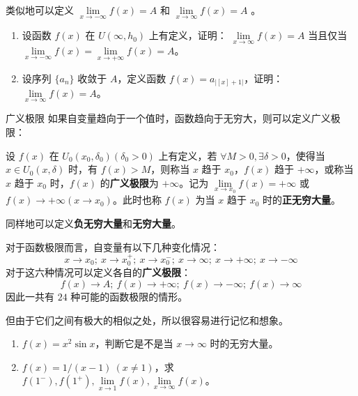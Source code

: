   类似地可以定义 $\lim\limits_{x\rightarrow -\infty}f(x)=A$ 和 $\lim\limits_{x\rightarrow \infty}f(x)=A$ 。
\begin{exercise}{}
\begin{enumerate}
\item 设函数 $f(x)$ 在 $U(\infty,h_0)$ 上有定义，证明： $\lim\limits_{x\rightarrow \infty} f(x)=A$ 当且仅当 $\lim\limits_{x\rightarrow -\infty}f(x)=\lim\limits_{x\rightarrow +\infty}f(x)=A$。
\item 设序列 $\{a_n\}$ 收敛于 $A$，定义函数 $f(x)=a_{|[x]+1|}$，证明：$\lim\limits_{x\rightarrow \infty} f(x)=A$。
\end{enumerate}
\end{exercise}

\begin{definition}{广义极限}
如果自变量趋向于一个值时，函数趋向于无穷大，则可以定义广义极限：

  设 $f(x)$ 在 $U_0(x_0,\delta_0)(\delta_0>0)$ 上有定义，若 $\forall M>0,\exists \delta>0$，使得当 $x\in U_0(x,\delta)$ 时，有 $f(x)>M$，则称当 $x$ 趋于 $x_0$，$f(x)$ 趋于 $+\infty$，或称当 $x$ 趋于 $x_0$ 时，$f(x)$ 的\textbf{广义极限}为 $+\infty$。记为 $\lim\limits_{x\rightarrow x_0}f(x)=+\infty$ 或 $f(x)\rightarrow +\infty(x\rightarrow x_0)$。此时也称 $f(x)$ 为当 $x$ 趋于 $x_0$ 时的\textbf{正无穷大量}。

  同样地可以定义\textbf{负无穷大量}和\textbf{无穷大量}。
\end{definition}

  

  对于函数极限而言，自变量有以下几种变化情况：
\begin{equation}
  x\rightarrow x_0;\ x\rightarrow x_0^+;\ x\rightarrow x_0^{-};\ x\rightarrow \infty;\ x\rightarrow +\infty;\ x\rightarrow -\infty
\end{equation}
  对于这六种情况可以定义各自的\textbf{广义极限}：
\begin{equation}
  f(x)\rightarrow A;\ f(x)\rightarrow +\infty;\ f(x)\rightarrow -\infty;\ f(x)\rightarrow \infty
\end{equation}
  因此一共有 $24$ 种可能的函数极限的情形。

  但由于它们之间有极大的相似之处，所以很容易进行记忆和想象。

\begin{exercise}{}
\begin{enumerate}
\item $f(x)=x^2\sin x$，判断它是不是当 $x\rightarrow \infty$ 时的无穷大量。
\item $f(x)=1/(x-1)\ (x\neq 1)$，求 $f(1^-),f(1^+),\lim\limits_{x\rightarrow 1}f(x),\lim\limits_{x\rightarrow \infty}f(x)$。
\end{enumerate}
\end{exercise}